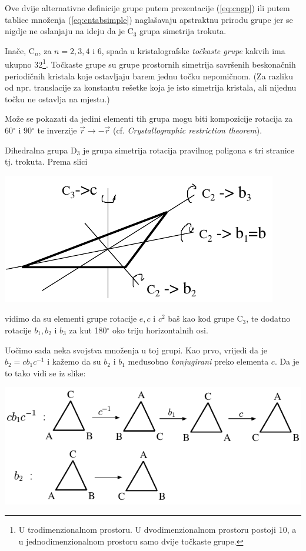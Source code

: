 Ove dvije alternativne definicije grupe putem prezentacije (\ref{eq:cngp}) ili
putem tablice množenja (\ref{eq:cntabsimple}) 
naglašavaju apstraktnu prirodu grupe jer se nigdje ne oslanjaju
na ideju da je C$_3$ grupa simetrija trokuta.

Inače, C$_n$, za $n=2,3,4$ i $6$, spada u kristalografske \emph{točkaste grupe} kakvih
ima ukupno 32\footnote{U trodimenzionalnom prostoru. U dvodimenzionalnom prostoru postoji 10, a u
jednodimenzionalnom prostoru samo dvije točkaste grupe.}. 
Točkaste grupe su grupe prostornih simetrija savršenih beskonačnih
periodičnih kristala koje ostavljaju barem jednu točku nepomičnom. (Za
razliku od npr. translacije za konstantu rešetke koja je isto simetrija
kristala, ali nijednu točku ne ostavlja na mjestu.)
  
Može se pokazati da jedini elementi tih grupa mogu biti kompozicije
rotacija za 60$^\circ$ i 90$^\circ$ te inverzije $\vec{r}\to -\vec{r}$
(cf. \emph{Crystallographic restriction theorem}).
   

\begin{primjer}
    Dihedralna grupa $\mathrm{D}_3$ je grupa simetrija rotacija pravilnog poligona s tri
    stranice tj. trokuta.  Prema slici\\[2ex]
    \centerline{\includegraphics[scale=1.0]{pics/D3}}
vidimo da su elementi grupe rotacije $e, c$ i  $c^2$ baš kao kod grupe $\mathrm{C}_3$, te
dodatno rotacije $b_1, b_2$ i $b_3$ za kut 180$^\circ$ oko triju horizontalnih
osi.
\end{primjer}

Uočimo sada neka svojstva množenja u toj grupi. Kao prvo, vrijedi
da je $b_2 = c b_1 c^{-1}$ i kažemo da su $b_2$ i $b_1$ međusobno
\emph{konjugirani} preko elementa $c$. Da je to tako vidi
se iz slike:

\centerline{\includegraphics[scale=1.0]{pics/cbc}}

